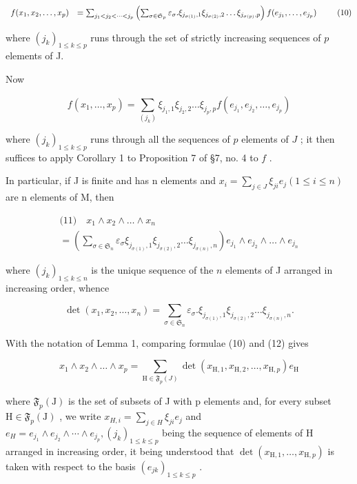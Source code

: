 \[
\begin{array}{r l} f (x _ {1}, x _ {2}, \dots , x _ {p}) & = \sum_ {j _ {1} <   j _ {2} <   \dots <   j _ {p}} \left(\sum_ {\sigma \in \mathfrak {S} _ {p}} \varepsilon_ {\sigma}. \xi_ {j _ {\sigma (1)}, 1} \xi_ {j _ {\sigma (2)}, 2} \dots \xi_ {j _ {\sigma (p)}, p}\right) f (e _ {j _ {1}}, \dots , e _ {j _ {p}}) \end{array}\tag{10}
\]

where \((j_k)_{1\leqslant k\leqslant p}\) runs through the set of strictly increasing sequences of \(p\) elements of J.

Now

\[
f (x _ {1}, \dots , x _ {p}) = \sum_ {(j _ {k})} \xi_ {j _ {1}, 1} \xi_ {j _ {2}, 2} \dots \xi_ {j _ {p}, p} f (e _ {j _ {1}}, e _ {j _ {2}}, \dots , e _ {j _ {p}})
\]

where \((j_k)_{1 \leqslant k \leqslant p}\) runs through all the sequences of \(p\) elements of \(J\) ; it then suffices to apply Corollary 1 to Proposition 7 of §7, no. 4 to \(f\) .

In particular, if J is finite and has n elements and \(x_{i} = \sum_{j \in J} \xi_{ji} e_{j} (1 \leqslant i \leqslant n)\) are n elements of M, then

\[
\begin{array}{l} \text {(11)} \quad x _ {1} \wedge x _ {2} \wedge \dots \wedge x _ {n} \\ = \left(\sum_ {\sigma \in \mathfrak {S} _ {n}} \varepsilon_ {\sigma} \xi_ {j _ {\sigma (1)}, 1} \xi_ {j _ {\sigma (2)}, 2} \dots \xi_ {j _ {\sigma (n)}, n}\right) e _ {j _ {1}} \wedge e _ {j _ {2}} \wedge \dots \wedge e _ {j _ {n}} \end{array}
\]

where \((j_k)_{1\leqslant k\leqslant n}\) is the unique sequence of the \(n\) elements of J arranged in increasing order, whence

\[
\det (x _ {1}, x _ {2}, \dots , x _ {n}) = \sum_ {\sigma \in \mathfrak {S} _ {n}} \varepsilon_ {\sigma}. \xi_ {j _ {\sigma (1)}, 1} \xi_ {j _ {\sigma (2)}, 2} \dots \xi_ {j _ {\sigma (n)}, n}.\tag{12}
\]

With the notation of Lemma 1, comparing formulae (10) and (12) gives

\[
x _ {1} \wedge x _ {2} \wedge \dots \wedge x _ {p} = \sum_ {\mathrm{H} \in \mathfrak {F} _ {p} (J)} \det (x _ {\mathrm{H}, 1}, x _ {\mathrm{H}, 2}, \dots , x _ {\mathrm{H}, p}) e _ {\mathrm{H}}\tag{13}
\]

where \(\mathfrak{F}_{p}(\mathrm{J})\) is the set of subsets of J with p elements and, for every subset \(\mathrm{H}\in\mathfrak{F}_{p}(\mathrm{J})\) , we write \(x_{H,i}=\sum_{j\in H}\xi_{ji}e_{j}\) and \(e_{H}=e_{j_{1}}\wedge e_{j_{2}}\wedge\cdots\wedge e_{j_{p}},(j_{k})_{1\leqslant k\leqslant p}\) being the sequence of elements of H arranged in increasing order, it being understood that \(\det(x_{\mathrm{H},1},\ldots,x_{\mathrm{H},p})\) is taken with respect to the basis \((e_{jk})_{1\leqslant k\leqslant p}\) .

